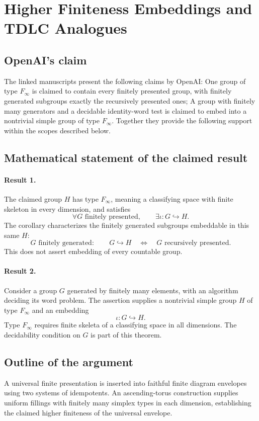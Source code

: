\documentclass[11pt]{article}
\begin{document}
\section*{Higher Finiteness Embeddings and TDLC Analogues}

\subsection{OpenAI's claim}
The linked manuscripts present the following claims by OpenAI: One group of type $F_\infty$ is claimed to contain every finitely presented group, with finitely generated subgroups exactly the recursively presented ones; A group with finitely many generators and a decidable identity-word test is claimed to embed into a nontrivial simple group of type $F_\infty$. Together they provide the following support within the scopes described below.

\subsection{Mathematical statement of the claimed result}
\paragraph{Result 1.} The claimed group \(H\) has type \(F_\infty\), meaning a classifying space with finite skeleton in every dimension, and satisfies
\[
 \forall G\text{ finitely presented},\qquad\exists\iota:G\hookrightarrow H.
\]
The corollary characterizes the finitely generated subgroups embeddable in this same \(H\):
\[
 G\text{ finitely generated}:\qquad G\hookrightarrow H
 \quad\Longleftrightarrow\quad G\text{ recursively presented}.
\]
This does not assert embedding of every countable group.

\paragraph{Result 2.} Consider a group \(G\) generated by finitely many elements, with an algorithm deciding its word problem. The assertion supplies a nontrivial simple group \(H\) of type \(F_\infty\) and an embedding
\[
 \iota:G\hookrightarrow H.
\]
Type \(F_\infty\) requires finite skeleta of a classifying space in all dimensions. The decidability condition on \(G\) is part of this theorem.

\subsection{Outline of the argument}
A universal finite presentation is inserted into faithful finite diagram envelopes using two systems of idempotents. An ascending-torus construction supplies uniform fillings with finitely many simplex types in each dimension, establishing the claimed higher finiteness of the universal envelope.
\end{document}
